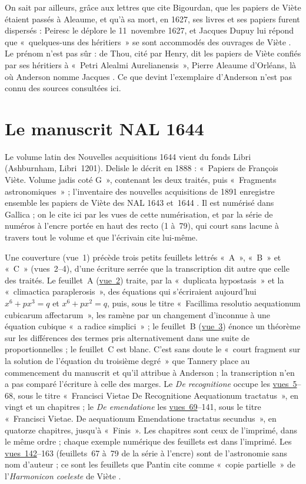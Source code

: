 \documentclass[11pt,a4paper]{article}
\theoremstyle{remark}
\newcommand{\vue}[1]{\href{https://gallica.bnf.fr/ark:/12148/btv1b10033620q/f#1.item}{vue~#1}}
\newcommand{\vues}[2]{\href{https://gallica.bnf.fr/ark:/12148/btv1b10033620q/f#1.item}{vues~#1}--#2}
\begin{document}
On sait par ailleurs, grâce aux lettres que cite Bigourdan, que les papiers
de Viète étaient passés à Aleaume, et qu'à sa mort, en 1627, ses livres et
ses papiers furent dispersés : Peiresc le déplore le 11~novembre 1627, et
Jacques Dupuy lui répond que «~quelques-uns des héritiers~» se sont
accommodés des ouvrages de Viète \cite[p.~237--238]{bigourdan1916}. Le
prénom n'est pas sûr : de Thou, cité par Henry, dit les papiers de Viète
confiés par ses héritiers à «~Petri Alealmi Aurelianensis~», Pierre
Aleaume d'Orléans, là où Anderson nomme Jacques \cite{henry1880}. Ce que
devint l'exemplaire d'Anderson n'est pas connu des sources consultées ici.

\section{Le manuscrit NAL 1644}\label{sec:manuscrit}

Le volume latin des Nouvelles acquisitions 1644 vient du fonds Libri
(Ashburnham, Libri~1201). Delisle le décrit en 1888 : «~Papiers de François
Viète. Volume jadis coté G~», contenant les deux traités, puis «~Fragments
astronomiques~» \cite[p.~166, n\textsuperscript{o}~CXX]{delisle1888} ;
l'inventaire des nouvelles acquisitions de 1891 enregistre ensemble les
papiers de Viète des NAL 1643 et~1644 \cite[t.~II, p.~664]{delisle1891}. Il est
numérisé dans Gallica \cite{gallica} ; on le cite ici par les vues de cette
numérisation, et par la série de numéros à l'encre portée en haut des recto
(1 à~79), qui court sans lacune à travers tout le volume et que l'écrivain
cite lui-même.

Une couverture (vue~1) précède trois petits feuillets lettrés «~A~»,
«~B~» et «~C~» (vues~2--4), d'une écriture serrée que la transcription dit
autre que celle des traités. Le feuillet~A (\vue{2}) traite, par la
«~duplicata hypostasis~» et la «~climactica paraplerosis~», des équations
qui s'écriraient aujourd'hui $x^6 + px^3 = q$ et $x^6 + px^2 = q$, puis,
sous le titre «~Facillima resolutio aequationum cubicarum affectarum~»,
les ramène par un changement d'inconnue à une équation cubique «~a radice
simplici~» ; le
feuillet~B (\vue{3}) énonce un théorème sur les différences des termes pris
alternativement dans une suite de proportionnelles ; le feuillet~C est
blanc. C'est sans doute le «~court fragment sur la solution de l'équation
du troisième degré~» que Tannery place au commencement du manuscrit et
qu'il attribue à Anderson \cite{tannery1902} ; la transcription n'en a pas
comparé l'écriture à celle des marges. Le
\emph{De recognitione} occupe les \vues{5}{68}, sous le titre «~Francisci
Vietae De Recognitione Aequationum tractatus~», en vingt et un chapitres ; le
\emph{De emendatione} les \vues{69}{141}, sous le titre «~Francisci Vietae. De
aequationum Emendatione tractatus secundus~», en quatorze chapitres, jusqu'à
«~Finis~». Les chapitres sont ceux de l'imprimé, dans le même ordre ; chaque
exemple numérique des feuillets est dans l'imprimé. Les \vues{142}{163}
(feuillets~67 à~79 de la série à l'encre) sont de l'astronomie sans nom
d'auteur ; ce sont les feuillets que Pantin cite comme «~copie partielle~»
de l'\emph{Harmonicon coeleste} de Viète \cite[p.~123,
n.~22]{pantin2003}.
\end{document}
